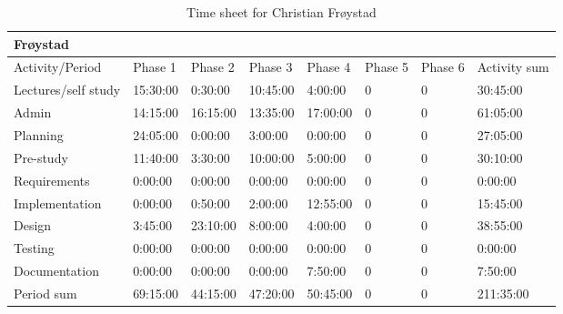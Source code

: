 \documentclass[11pt]{book}
\begin{document}
\begin{table}[H]
\centering
\begin{tabular}{| l | l | l | l | l | l | l | l |}
    \hline
    Frøystad            &             &             &             &             &             &             &                 \\ \hline            
    Activity/Period     & Phase 1     & Phase 2     & Phase  3    & Phase 4     & Phase 5     & Phase 6     & Activity sum    \\ \hline
    Lectures/self study & 15:30:00    & 0:30:00     & 10:45:00    & 4:00:00     & 0           & 0           & 30:45:00        \\ \hline
    Admin               & 14:15:00    & 16:15:00    & 13:35:00    & 17:00:00    & 0           & 0           & 61:05:00        \\ \hline
    Planning            & 24:05:00    & 0:00:00     & 3:00:00     & 0:00:00     & 0           & 0           & 27:05:00        \\ \hline
    Pre-study           & 11:40:00    & 3:30:00     & 10:00:00    & 5:00:00     & 0           & 0           & 30:10:00        \\ \hline
    Requirements        & 0:00:00     & 0:00:00     & 0:00:00     & 0:00:00     & 0           & 0           & 0:00:00         \\ \hline
    Implementation      & 0:00:00     & 0:50:00     & 2:00:00     & 12:55:00    & 0           & 0           & 15:45:00        \\ \hline
    Design              & 3:45:00     & 23:10:00    & 8:00:00     & 4:00:00     & 0           & 0           & 38:55:00        \\ \hline
    Testing             & 0:00:00     & 0:00:00     & 0:00:00     & 0:00:00     & 0           & 0           & 0:00:00         \\ \hline
    Documentation       & 0:00:00     & 0:00:00     & 0:00:00     & 7:50:00     & 0           & 0           & 7:50:00         \\ \hline
    Period sum          & 69:15:00    & 44:15:00    & 47:20:00    & 50:45:00    & 0           & 0           & 211:35:00       \\ \hline
\end{tabular}
\caption{Time sheet for Christian Frøystad}
\label{tab:appendix_timesheets_christian}
\end{table}
\end{document}
